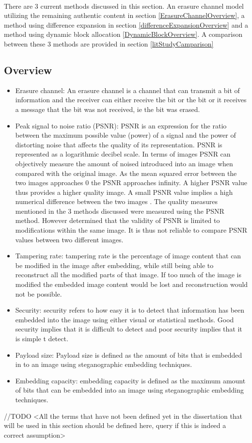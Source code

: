 \documentclass[12pt]{article}
\begin{document}
\hspace{0pt} \\
There are 3 current methods discussed in this section. An erasure channel model utilizing the remaining authentic content in section \ref{ErasureChannelOverview}, a method using difference expansion in section \ref{differenceExpansionOverview} and a method using dynamic block allocation \ref{DynamicBlockOverview}. A comparison between these 3 methods are provided in section \ref{litStudyCamparison}

\subsection{Overview}
\begin{itemize}
	\item Erasure channel: An erasure channel is a channel that can transmit a bit of information and the receiver can either receive the bit or the bit or it receives a message that the bit was not received, ie the bit was erased.
	\item Peak signal to noise ratio (PSNR): PSNR is an expression for the ratio between the maximum possible value (power) of a signal and the power of distorting noise that affects the quality of its representation. PSNR is represented as a logarithmic decibel scale. In terms of images PSNR can objectively measure the amount of noised introduced into an image when compared with the original image. 
	As the mean squared error between the two images approaches 0 the PSNR approaches infinity. A higher PSNR value thus provides a higher quality image. 
	A small PSNR value implies a high numerical difference between the two images \cite{hore2010image}.  
	The quality measures mentioned in the 3 methods discussed were measured using the PSNR method. \cite{huynh2008scope} However determined that the validity of PSNR is limited to modifications within the same image.
	It is thus not reliable to compare PSNR values between two different images.
	\item Tampering rate: tampering rate is the percentage of image content that can be modified in the image after embedding, while still being able to reconstruct all the modified parts of that image.
	If too much of the image is modified the embedded image content would be lost and reconstruction would not be possible.
	\item Security: security refers to how easy it is to detect that information has been embedded into the image using either visual or statistical methods. Good security implies that it is difficult to detect and poor security implies that it is simple t detect.
	\item Payload size: Payload size is defined as the amount of bits that is embedded in to an image using steganographic embedding techniques. 
	\item Embedding capacity: embedding capacity is defined as the maximum amount of bits that can be embedded into an image using steganographic embedding techniques.
\end{itemize}
//TODO <All the terms that have not been defined yet in the dissertation that will be used in this section should be defined here, query if this is indeed a correct assumption>
\end{document}
